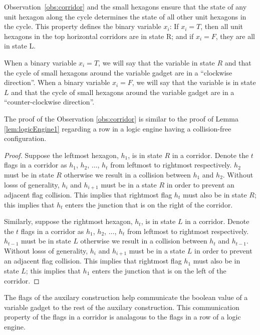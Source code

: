 \documentclass[10pt]{CSUNthesis}
\theoremstyle{plain}%
\theoremstyle{definition}
\theoremstyle{remark}
\begin{document}
Observation~\ref{obs:corridor} and the small hexagons ensure that the state of any unit hexagon along the cycle determines the state of all other unit hexagons in the cycle. 
This property defines the binary variable $x_i$: If $x_i=T$, then all unit hexagons in the top horizontal corridors are in state R; and if $x_i=F$, they are all in state L.

When a binary variable $x_i = T$, we will say that the variable in state $R$ and that the cycle of small hexagons around the variable gadget are in a ``clockwise direction''.
When a binary variable $x_i = F$, we will say that the variable is in state $L$ and that the cycle of small hexagons around the variable gadget are in a ``counter-clockwise direction''. 

The proof of the Observation \ref{obs:corridor} is similar to the proof of Lemma \ref{lem:logicEngine1} regarding a row in a logic engine having a collision-free configuration.
\begin{proof}
Suppose the leftmost hexagon, $h_1$, is in state $R$ in a corridor.
Denote the $t$ flags in a corridor as $h_1$, $h_2$, $\ldots$, $h_t$ from leftmost to rightmost respectively.
$h_2$ must be in state $R$ otherwise we result in a collision between $h_1$ and $h_2$.
Without losss of generality, $h_i$ and $h_{i+1}$ must be in a state $R$ in order to prevent an adjacent flag collision. 
This implies that rightmost flag $h_t$ must also be in state $R$; this implies that $h_t$ enters the junction that is on the right of the corridor.

Similarly, suppose the rightmost hexagon, $h_t$, is in state $L$ in a corridor.
Denote the $t$ flags in a corridor as $h_1$, $h_2$, $\ldots$, $h_t$ from leftmost to rightmost respectively.
$h_{t-1}$ must be in state $L$ otherwise we result in a collision between $h_t$ and $h_{t-1}$.
Without losss of generality, $h_i$ and $h_{i+1}$ must be in a state $L$ in order to prevent an adjacent flag collision. 
This implies that rightmost flag $h_1$ must also be in state $L$; this implies that $h_1$ enters the junction that is on the left of the corridor.
\end{proof}
The flags of the auxilary construction help communicate the boolean value of a variable gadget to the rest of the auxilary construction.
This communication property of the flags in a corridor is analagous to the flags in a row of a logic engine.
\end{document}
